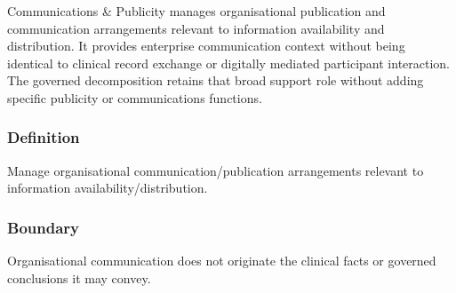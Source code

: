 Communications \& Publicity manages organisational publication and communication arrangements relevant to information availability and distribution. It provides enterprise communication context without being identical to clinical record exchange or digitally mediated participant interaction. The governed decomposition retains that broad support role without adding specific publicity or communications functions.

\subsubsection*{Definition}

Manage organisational communication/\allowbreak{}publication arrangements relevant to information availability/\allowbreak{}distribution.

\subsubsection*{Boundary}

Organisational communication does not originate the clinical facts or governed conclusions it may convey.

